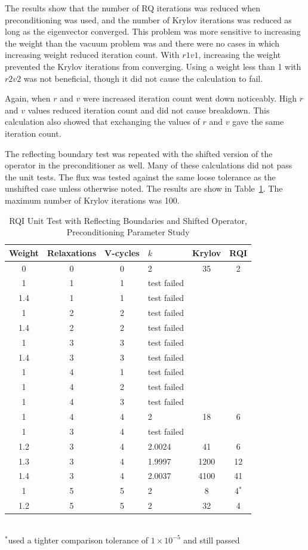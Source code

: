 The results show that the number of RQ iterations was reduced when preconditioning was used, and the number of  Krylov iterations was reduced as long as the eigenvector converged. This problem was more sensitive to increasing the weight than the vacuum problem was and there were no cases in which increasing weight reduced iteration count. With $r1v1$, increasing the weight prevented the Krylov iterations from converging. Using a weight less than 1 with $r2v2$ was not beneficial, though it did not cause the calculation to fail. 

Again, when $r$ and $v$ were increased iteration count went down noticeably. High $r$ and $v$ values reduced iteration count and did not cause breakdown. This calculation also showed that exchanging the values of $r$ and $v$ gave the same iteration count. 

The reflecting boundary test was repeated with the shifted version of the operator in the preconditioner as well. Many of these calculations did not pass the unit tests. The flux was tested against the same loose tolerance as the unshifted case unless otherwise noted. The results are show in Table~\ref{table:RQIUnitTestReflShifted}. The maximum number of Krylov iterations was 100.
%
\begin{table}[!h]
\caption{RQI Unit Test with Reflecting Boundaries and Shifted Operator, Preconditioning Parameter Study}
\begin{center}
\begin{tabular}{| c | c | c | l | c | c |}
\hline
Weight & Relaxations & V-cycles & $k$ & Krylov & RQI \\[0.5ex]
\hline
0    & 0 & 0 & 2 & 35 & 2 \\
1    & 1 & 1 & test failed & & \\
1.4 & 1 & 1 & test failed & & \\
1    & 2 & 2 & test failed & & \\
1.4 & 2 & 2 & test failed & & \\
1    & 3 & 3 & test failed & & \\
1.4 & 3 & 3 & test failed & & \\
1    & 4 & 1 & test failed & & \\
1    & 4 & 2 & test failed & & \\
1    & 4 & 3 & test failed & & \\
1    & 4 & 4 & 2 & 18 & 6 \\ 
1    & 3 & 4 & test failed & & \\
1.2 & 3 & 4 & 2.0024 & 41 & 6 \\
1.3 & 3 & 4 & 1.9997 & 1200 & 12 \\
1.4 & 3 & 4 & 2.0037 & 4100 & 41 \\
1    & 5 & 5 & 2 & 8 & 4$^{*}$ \\
1.2 & 5 & 5 & 2& 32 & 4 \\
\hline 
\end{tabular}\\
$^{*}$used a tighter comparison tolerance of $1 \times 10^{-5}$ and still passed
\end{center}
\label{table:RQIUnitTestReflShifted}
\end{table}

